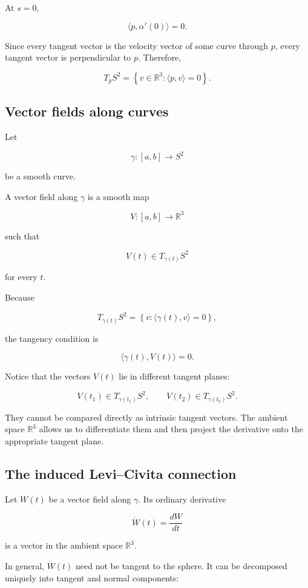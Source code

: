 \documentclass[12pt,a4paper]{article}
\theoremstyle{notespace}
\begin{document}
At \(s=0\),

\[
\langle p,\alpha'(0)\rangle=0.
\]

Since every tangent vector is the velocity vector of some curve through
\(p\), every tangent vector is perpendicular to \(p\). Therefore,

\[
T_pS^2
=
\left\{
v\in\mathbb{R}^3:
\langle p,v\rangle=0
\right\}.
\]

\subsection{Vector fields along curves}

Let

\[
\gamma:[a,b]\longrightarrow S^2
\]

be a smooth curve.

A vector field along \(\gamma\) is a smooth map

\[
V:[a,b]\longrightarrow\mathbb{R}^3
\]

such that

\[
V(t)\in T_{\gamma(t)}S^2
\]

for every \(t\).

Because

\[
T_{\gamma(t)}S^2
=
\left\{
v:
\langle\gamma(t),v\rangle=0
\right\},
\]

the tangency condition is

\[
\boxed{
	\langle\gamma(t),V(t)\rangle=0.
}
\]

Notice that the vectors \(V(t)\) lie in different tangent planes:

\[
V(t_1)\in T_{\gamma(t_1)}S^2,
\qquad
V(t_2)\in T_{\gamma(t_2)}S^2.
\]

They cannot be compared directly as intrinsic tangent vectors. The
ambient space \(\mathbb{R}^3\) allows us to differentiate them and then
project the derivative onto the appropriate tangent plane.

\subsection{The induced Levi--Civita connection}

Let \(W(t)\) be a vector field along \(\gamma\). Its ordinary derivative

\[
\dot W(t)=\frac{dW}{dt}
\]

is a vector in the ambient space \(\mathbb{R}^3\).

In general, \(\dot W(t)\) need not be tangent to the sphere. It can be
decomposed uniquely into tangent and normal components:
\end{document}
